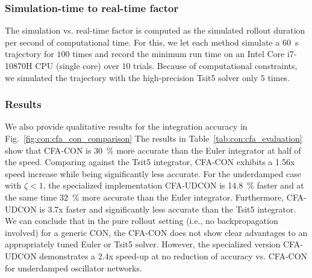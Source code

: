 \subsubsection{Simulation-time to real-time factor} 
The simulation vs. real-time factor is computed as the simulated rollout duration per second of computational time. For this, we let each method simulate a \SI{60}{s} trajectory for $100$ times and record the minimum run time on an Intel Core i7-10870H CPU (single core) over $10$ trials. Because of computational constraints, we simulated the trajectory  with the high-precision Tsit5 solver only $5$ times. 


\subsubsection{Results}
We also provide qualitative results for the integration accuracy in Fig.~\ref{fig:con:cfa_con_comparison}
The results in Table~\ref{tab:con:cfa_evaluation} show that \gls{CFA-CON} is \SI{30}{\percent} more accurate than the Euler integrator at half of the speed. Comparing against the Tsit5 integrator, \gls{CFA-CON} exhibits a 1.56x speed increase while being significantly less accurate.
For the underdamped case with $\zeta < 1$, the specialized implementation \gls{CFA-UDCON} is \SI{14.8}{\percent} faster and at the same time \SI{32}{\percent} more accurate than the Euler integrator. Furthermore, \gls{CFA-UDCON} is 3.7x faster and significantly less accurate than the Tsit5 integrator.
We can conclude that in the pure rollout setting (i.e., no backpropagation involved) for a generic \gls{CON}, the \gls{CFA-CON} does not show clear advantages to an appropriately tuned Euler or Tsit5 solver. However, the specialized version \gls{CFA-UDCON} demonstrates a 2.4x speed-up at no reduction of accuracy vs. \gls{CFA-CON} for underdamped oscillator networks.



